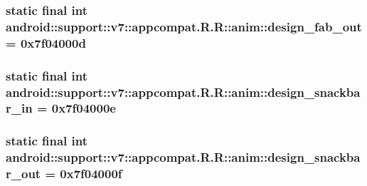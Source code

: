 \hypertarget{classandroid_1_1support_1_1v7_1_1appcompat_1_1_r_1_1anim_210c4f63c1d844f72c44b0e29d3e41ef}{
\subsubsection[{design\_\-fab\_\-out}]{\setlength{\rightskip}{0pt plus 5cm}static final int android::support::v7::appcompat.R.R::anim::design\_\-fab\_\-out = 0x7f04000d}}
\label{classandroid_1_1support_1_1v7_1_1appcompat_1_1_r_1_1anim_210c4f63c1d844f72c44b0e29d3e41ef}


\hypertarget{classandroid_1_1support_1_1v7_1_1appcompat_1_1_r_1_1anim_1e0a7735a626e9320423d47496abdf5a}{
\subsubsection[{design\_\-snackbar\_\-in}]{\setlength{\rightskip}{0pt plus 5cm}static final int android::support::v7::appcompat.R.R::anim::design\_\-snackbar\_\-in = 0x7f04000e}}
\label{classandroid_1_1support_1_1v7_1_1appcompat_1_1_r_1_1anim_1e0a7735a626e9320423d47496abdf5a}


\hypertarget{classandroid_1_1support_1_1v7_1_1appcompat_1_1_r_1_1anim_8a05573fcb0e55e1feb33e2707d0514a}{
\subsubsection[{design\_\-snackbar\_\-out}]{\setlength{\rightskip}{0pt plus 5cm}static final int android::support::v7::appcompat.R.R::anim::design\_\-snackbar\_\-out = 0x7f04000f}}
\label{classandroid_1_1support_1_1v7_1_1appcompat_1_1_r_1_1anim_8a05573fcb0e55e1feb33e2707d0514a}




